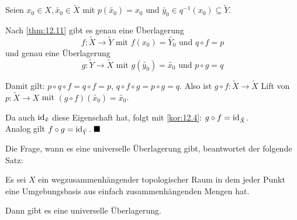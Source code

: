 \begin{beweis}
    Seien $x_0 \in X, \tilde{x_0} \in \tilde{X}$ mit 
    $p(\tilde{x_0}) = x_0$ und 
    $\tilde{y_0} \in q^{-1}(x_0) \subseteq \tilde{Y}$.

    Nach \cref{thm:12.11} gibt es genau eine Überlagerung
    \[f:\tilde{X} \rightarrow \tilde{Y} \text{ mit } f(x_0) = \tilde{Y_0} \text{ und } q \circ f = p\]
    und genau eine Überlagerung
    \[g: \tilde{Y} \rightarrow \tilde{X} \text{ mit } g(\tilde{y_0}) = \tilde{x_0} \text{ und } p \circ g = q\]

    Damit gilt: $p \circ q \circ f = q \circ f = p$, $q \circ f \circ g = p \circ g = q$.
    Also ist $g \circ f: \tilde{X} \rightarrow \tilde{X}$ Lift von 
    $p:\tilde{X} \rightarrow X$ mit $(g \circ f) (\tilde{x_0}) = \tilde{x_0}$.

    Da auch $\textnormal{id}_{\tilde{x}}$ diese Eigenschaft hat, folgt mit
    \cref{kor:12.4}: $g \circ f = \textnormal{id}_{\tilde{X}}$.\\
    Analog gilt $f \circ g = \textnormal{id}_{\tilde{Y}}$. $\qed$
\end{beweis}

Die Frage, wann es eine universelle Überlagerung gibt, beantwortet
der folgende Satz:

\begin{satz}%
    Es sei $X$ ein wegzusammenhängender topologischer Raum in dem
    jeder Punkt eine Umgebungsbasis aus einfach zusammenhängenden
    Mengen hat.

    Dann gibt es eine universelle Überlagerung.
\end{satz}

